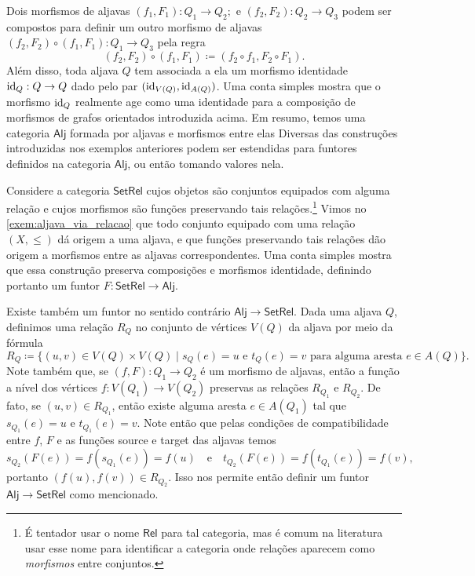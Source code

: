 Dois morfismos de aljavas $(f_1,F_1): Q_1 \to Q_2;$ e $(f_2,F_2): Q_2 \to Q_3$ podem ser compostos para definir um outro morfismo de aljavas $(f_2,F_2) \circ (f_1,F_1): Q_1 \to Q_3$ pela regra
\begin{displaymath}
    (f_2,F_2) \circ (f_1,F_1) \coloneqq (f_2 \circ f_1,F_2 \circ F_1).
\end{displaymath}
Além disso, toda aljava $Q$ tem associada a ela um morfismo identidade $\mathrm{id}_Q: Q \to Q$ dado pelo par $(\mathrm{id}_{V(Q)},\mathrm{id}_{A(Q)})$.
Uma conta simples mostra que o morfismo $\mathrm{id}_Q$ realmente age como uma identidade para a composição de morfismos de grafos orientados introduzida acima.
Em resumo, temos uma categoria $\mathsf{Alj}$ formada por aljavas e morfismos entre elas
Diversas das construções introduzidas nos exemplos anteriores podem ser estendidas para funtores definidos na categoria $\mathsf{Alj}$, ou então tomando valores nela.

\begin{exem}
    Considere a categoria $\mathsf{SetRel}$ cujos objetos são conjuntos equipados com alguma relação e cujos morfismos são funções preservando tais relações.\footnote{É tentador usar o nome $\mathsf{Rel}$ para tal categoria, mas é comum na literatura usar esse nome para identificar a categoria onde relações aparecem como \emph{morfismos} entre conjuntos.}
    Vimos no \cref{exem:aljava_via_relacao} que todo conjunto equipado com uma relação $(X,\leq)$ dá origem a uma aljava, e que funções preservando tais relações dão origem a morfismos entre as aljavas correspondentes.
    Uma conta simples mostra que essa construção preserva composições e morfismos identidade, definindo portanto um funtor $F: \mathsf{SetRel} \to \mathsf{Alj}$.
    
    Existe também um funtor no sentido contrário $\mathsf{Alj} \to \mathsf{SetRel}$.
    Dada uma aljava $Q$, definimos uma relação $R_Q$ no conjunto de vértices $V(Q)$ da aljava por meio da fórmula
    \begin{displaymath}
        R_Q \coloneqq \{(u,v) \in V(Q) \times V(Q) \mid s_Q(e) = u \text{ e } t_Q(e) = v \text{ para alguma aresta } e \in A(Q)\}.
    \end{displaymath}
    Note também que, se $(f,F): Q_1 \to Q_2$ é um morfismo de aljavas, então a função a nível dos vértices $f: V(Q_1) \to V(Q_2)$ preservas as relações $R_{Q_1}$ e $R_{Q_2}$.
    De fato, se $(u,v) \in R_{Q_1}$, então existe alguma aresta $e \in A(Q_1)$ tal que $s_{Q_1}(e) = u$ e $t_{Q_1}(e) = v$.
    Note então que pelas condições de compatibilidade entre $f$, $F$ e as funções source e target das aljavas temos
    \begin{displaymath}
        s_{Q_2}(F(e)) = f(s_{Q_1}(e)) = f(u)
        \quad \text{e} \quad
        t_{Q_2}(F(e)) = f(t_{Q_1}(e)) = f(v),
    \end{displaymath}
    portanto $(f(u),f(v)) \in R_{Q_2}$.
    Isso nos permite então definir um funtor $\mathsf{Alj} \to \mathsf{SetRel}$ como mencionado.
\end{exem}

